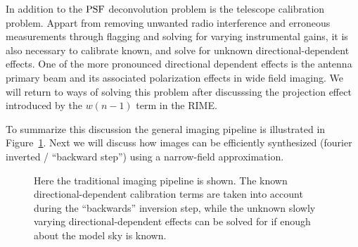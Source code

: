 In addition to the $\textrm{PSF}$ deconvolution problem is the telescope calibration problem. Appart from removing unwanted
radio interference and erroneous measurements through flagging and solving for varying instrumental gains, it is also
necessary to calibrate known, and solve for unknown directional-dependent effects. One of the more pronounced directional 
dependent effects is the antenna primary beam and its associated polarization effects in wide field imaging. We will return
to ways of solving this problem after discusssing the projection effect introduced by the $w(n-1)$ term in the RIME.

To summarize this discussion the general imaging pipeline is illustrated in Figure~\ref{fig_img_pipeline}. Next we will discuss
how images can be efficiently synthesized (fourier inverted / ``backward step'') using a narrow-field approximation.
\begin{figure}[h]
 \centering
 \caption[Imaging pipeline]{Here the traditional imaging pipeline is shown. The known directional-dependent calibration terms are taken 
 into account during the ``backwards'' inversion step, while the unknown slowly varying directional-dependent effects can be solved for
 if enough about the model sky is known.}
 \label{fig_img_pipeline}
\end{figure}

